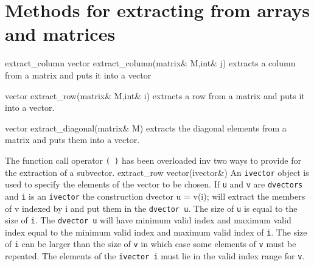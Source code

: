 \documentclass[12pt]{book}
\begin{document}
\section{Methods for extracting from arrays and matrices}
 {extract\_column}
\beginexample
vector extract_column(matrix& M,int& j)
\endexample
\noindent extracts a column from a matrix and puts it into a vector 

\beginexample
vector extract_row(matrix& M,int& i)
\endexample
\noindent extracts a row from a matrix and puts it into a vector.

\beginexample
vector extract_diagonal(matrix& M)
\endexample
\noindent extracts the diagonal elements from a matrix and puts them into
 a vector.

The function call operator {\tt (\ )} has been overloaded inv two ways to
provide for the extraction of a subvector. 
 {extract\_row}
\beginexample
vector(ivector&)
\endexample
\noindent An {\tt ivector} object is
used to specify the elements of the vector to be chosen. If 
{\tt u} and {\tt v} are {\tt dvectors}  and {\tt i} is an {\tt ivector}
the construction
\beginexample
dvector u = v(i);
\endexample
\noindent will extract the members of v indexed by i and put them in the
{\tt dvector u}. The size of {\tt u}
is equal to the size of {\tt i}. The {\tt dvector u} will have
minimum valid index and maximum valid index equal to the minimum
valid index and maximum valid index of {\tt i}. 
The size of {\tt i} can be larger than the size of {\tt v} 
in which case some elements of {\tt v} must be repeated. The elements of
the {\tt ivector i} must lie in the valid index range for {\tt v}. 
\end{document}
